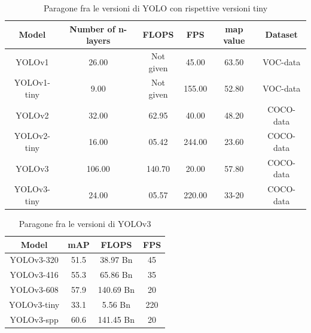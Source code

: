 \documentclass[a4paper]{article}
\begin{document}
	\begin{table}[htpb]
		\centering
		\begin{tabular}{  c c c c c c  } 
			\hline
			\textbf{Model} & \textbf{Number of n-layers} & \textbf{FLOPS} & \textbf{FPS} & \textbf{map value} & \textbf{Dataset} \\
			\hline	
			YOLOv1    		& 26.00   &  Not given  &  45.00   & 63.50 & VOC-data  \\ 
			YOLOv1-tiny     & 9.00    &  Not given  &  155.00  & 52.80 & VOC-data  \\ 
			YOLOv2    		& 32.00   &  62.95      &  40.00   & 48.20 & COCO-data \\ 
			YOLOv2-tiny   	& 16.00   &  05.42	    &  244.00  & 23.60 & COCO-data \\
			YOLOv3    		& 106.00  &  140.70	    &  20.00   & 57.80 & COCO-data \\
			YOLOv3-tiny    	& 24.00   &  05.57	    &  220.00  & 33-20 & COCO-data \\
			\hline
		\end{tabular}
		\caption{Paragone fra le versioni di YOLO con rispettive versioni tiny}
		\label{tab:comparisonversions}
	\end{table}
	
	\begin{table}[htpb]
		\centering
		\begin{tabular}{  c c c c  } 
			\hline
			\textbf{Model} & \textbf{mAP} & \textbf{FLOPS} & \textbf{FPS} \\
			\hline	
			 YOLOv3-320    & 51.5  &  38.97  Bn  &  45  \\ 
			 YOLOv3-416    & 55.3  &  65.86  Bn  &  35  \\ 
			 YOLOv3-608    & 57.9  &  140.69 Bn  &  20  \\ 
			 YOLOv3-tiny   & 33.1  &  5.56   Bn  &  220 \\
			 YOLOv3-spp    & 60.6  &  141.45 Bn  &  20  \\
			\hline
		\end{tabular}
	    \caption{Paragone fra le versioni di YOLOv3}
		\label{tab:comparison}
	\end{table}
\end{document}
